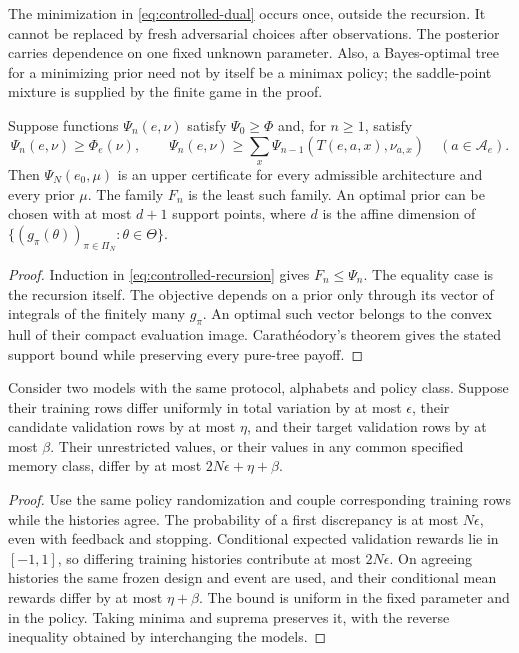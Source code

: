 The minimization in \eqref{eq:controlled-dual} occurs once, outside the
recursion. It cannot be replaced by fresh adversarial choices after
observations. The posterior carries dependence on one fixed unknown
parameter. Also, a Bayes-optimal tree for a minimizing prior need not by
itself be a minimax policy; the saddle-point mixture is supplied by the
finite game in the proof.

\begin{corollary}\label{cor:bellman-certificate}
Suppose functions $\Psi_n(e,\nu)$ satisfy $\Psi_0\ge\Phi$ and, for
$n\ge1$, satisfy
\[
 \Psi_n(e,\nu)\ge\Phi_e(\nu),\qquad
 \Psi_n(e,\nu)\ge\sum_x\Psi_{n-1}(T(e,a,x),\nu_{a,x})
                  \quad(a\in\mathcal A_e).
\]
Then $\Psi_N(e_0,\mu)$ is an upper certificate for every admissible
architecture and every prior $\mu$. The family $F_n$ is the least such
family. An optimal prior can be chosen with at most $d+1$ support points,
where $d$ is the affine dimension of
$\{(g_\pi(\theta))_{\pi\in\Pi_N}:\theta\in\Theta\}$.
\end{corollary}
\begin{proof}
Induction in \eqref{eq:controlled-recursion} gives $F_n\le\Psi_n$.
The equality case is the recursion itself. The objective depends on a
prior only through its vector of integrals of the finitely many
$g_\pi$. An optimal such vector belongs to the convex hull of their
compact evaluation image. Carath\'eodory's theorem gives the stated
support bound while preserving every pure-tree payoff.
\end{proof}

\begin{proposition}\label{prop:controlled-stability}
Consider two models with the same protocol, alphabets and policy class.
Suppose their training rows differ uniformly in total variation by at
most $\epsilon$, their candidate validation rows by at most $\eta$,
and their target validation rows by at most $\beta$. Their unrestricted
values, or their values in any common specified memory class, differ by
at most $2N\epsilon+\eta+\beta$.
\end{proposition}
\begin{proof}
Use the same policy randomization and couple corresponding training
rows while the histories agree. The probability of a first discrepancy
is at most $N\epsilon$, even with feedback and stopping. Conditional
expected validation rewards lie in $[-1,1]$, so differing training
histories contribute at most $2N\epsilon$. On agreeing histories the
same frozen design and event are used, and their conditional mean
rewards differ by at most $\eta+\beta$. The bound is uniform in the
fixed parameter and in the policy. Taking minima and suprema preserves
it, with the reverse inequality obtained by interchanging the models.
\end{proof}

